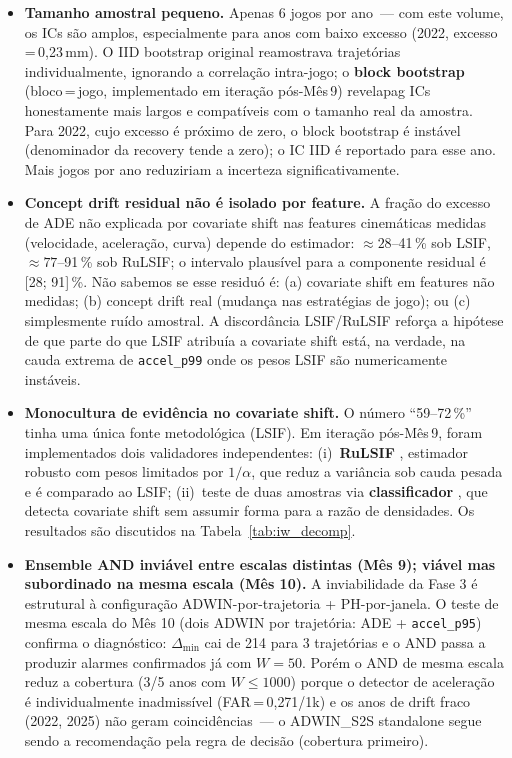 \documentclass[11pt,a4paper]{article}
\begin{document}
\begin{itemize}[leftmargin=1.4em,itemsep=4pt]
    \item \textbf{Tamanho amostral pequeno.} Apenas 6 jogos por ano~--- com este volume, os ICs s\~ao amplos, especialmente para anos com baixo excesso (2022, excesso\,=\,0{,}23\,mm). O IID bootstrap original reamostrava trajet\'orias individualmente, ignorando a correla\c{c}\~ao intra-jogo; o \textbf{block bootstrap} (bloco\,=\,jogo, implementado em itera\c{c}\~ao p\'os-M\^es\,9) revelapag ICs honestamente mais largos e compat\'iveis com o tamanho real da amostra. Para 2022, cujo excesso \'e pr\'oximo de zero, o block bootstrap \'e inst\'avel (denominador da recovery tende a zero); o IC IID \'e reportado para esse ano. Mais jogos por ano reduziriam a incerteza significativamente.

    \item \textbf{Concept drift residual n\~ao \'e isolado por feature.} A fra\c{c}\~ao do excesso de ADE n\~ao explicada por covariate shift nas features cinem\'aticas medidas (velocidade, acelera\c{c}\~ao, curva) depende do estimador: $\approx 28$--41\,\% sob LSIF, $\approx 77$--91\,\% sob RuLSIF; o intervalo plaus\'ivel para a componente residual \'e [28; 91]\,\%. N\~ao sabemos se esse residu\'o \'e: (a) covariate shift em features n\~ao medidas; (b) concept drift real (mudan\c{c}a nas estrat\'egias de jogo); ou (c) simplesmente ru\'ido amostral. A discord\^ancia LSIF/RuLSIF refor\c{c}a a hip\'otese de que parte do que LSIF atribu\'ia a covariate shift est\'a, na verdade, na cauda extrema de \texttt{accel\_p99} onde os pesos LSIF s\~ao numericamente inst\'aveis.

    \item \textbf{Monocultura de evid\^encia no covariate shift.} O n\'umero ``59--72\,\%'' tinha uma \'unica fonte metodol\'ogica (LSIF). Em itera\c{c}\~ao p\'os-M\^es\,9, foram implementados dois validadores independentes: (i)~\textbf{RuLSIF} \cite{yamada2013}, estimador robusto com pesos limitados por $1/\alpha$, que reduz a vari\^ancia sob cauda pesada e \'e comparado ao LSIF; (ii)~teste de duas amostras via \textbf{classificador} \cite{lopezpaz2017}, que detecta covariate shift sem assumir forma para a raz\~ao de densidades. Os resultados s\~ao discutidos na Tabela~\ref{tab:iw_decomp}.

    \item \textbf{Ensemble AND invi\'avel entre escalas distintas (M\^es 9); vi\'avel mas subordinado na mesma escala (M\^es 10).} A inviabilidade da Fase 3 \'e estrutural \`a configura\c{c}\~ao ADWIN-por-trajetoria + PH-por-janela. O teste de mesma escala do M\^es 10 (dois ADWIN por trajet\'oria: ADE + \texttt{accel\_p95}) confirma o diagn\'ostico: $\Delta_{\min}$ cai de 214 para 3 trajet\'orias e o AND passa a produzir alarmes confirmados j\'a com $W\!=\!50$. Por\'em o AND de mesma escala reduz a cobertura (3/5 anos com $W\!\leq\!1000$) porque o detector de acelera\c{c}\~ao \'e individualmente inadmiss\'ivel (FAR\,=\,0{,}271/1k) e os anos de drift fraco (2022, 2025) n\~ao geram coincid\^encias~--- o ADWIN\_S2S standalone segue sendo a recomenda\c{c}\~ao pela regra de decis\~ao (cobertura primeiro).


\end{itemize}
\end{document}
